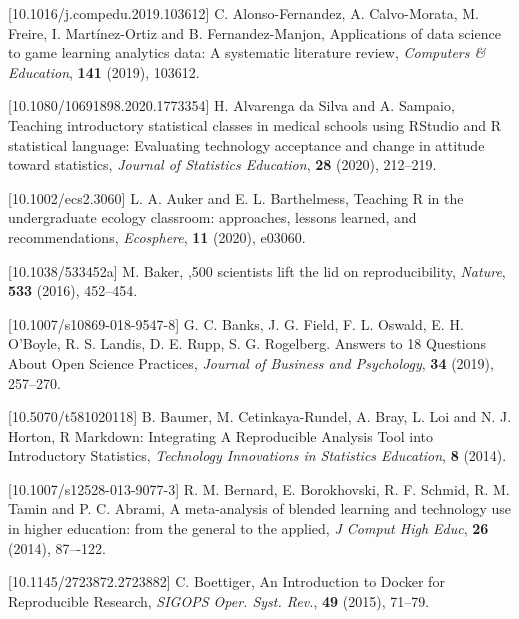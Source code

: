 \documentclass{aims}
\theoremstyle{definition}
\begin{document}
\begin{thebibliography}{99}

 [10.1016/j.compedu.2019.103612]
     \newblock  C. Alonso-Fernandez,  A. Calvo-Morata, M. Freire, I. Martínez-Ortiz and B. Fernandez-Manjon,
     \newblock Applications of data science to game learning analytics data: A systematic literature review,
     \newblock \emph{Computers \& Education}, \textbf{141} (2019), 103612.

 [10.1080/10691898.2020.1773354]
     \newblock  H. Alvarenga da Silva and A. Sampaio,
     \newblock Teaching introductory statistical classes in medical schools using RStudio and R statistical language: Evaluating technology acceptance and change in attitude toward statistics,
     \newblock \emph{Journal of Statistics Education}, \textbf{28} (2020), 212--219.

 [10.1002/ecs2.3060]
     \newblock  L. A. Auker and E. L. Barthelmess,
     \newblock Teaching R in the undergraduate ecology classroom: approaches, lessons learned, and recommendations,
     \newblock \emph{Ecosphere}, \textbf{11} (2020), e03060.

 [10.1038/533452a]
     \newblock  M. Baker,
     ,500 scientists lift the lid on reproducibility,
     \newblock \emph{Nature}, \textbf{533} (2016), 452--454.

 [10.1007/s10869-018-9547-8]
     \newblock  G. C. Banks, J. G. Field, F. L. Oswald, E. H. O'Boyle, R. S. Landis, D. E. Rupp, S. G. Rogelberg.
     \newblock Answers to 18 Questions About Open Science Practices,
     \newblock \emph{Journal of Business and Psychology}, \textbf{34} (2019), 257--270.

 [10.5070/t581020118]
     \newblock B. Baumer, M. Cetinkaya-Rundel, A. Bray, L. Loi and N. J. Horton,
     \newblock R Markdown: Integrating A Reproducible Analysis Tool into Introductory Statistics,
     \newblock \emph{Technology Innovations in Statistics Education}, \textbf{8} (2014).

 [10.1007/s12528-013-9077-3]
     \newblock  R. M. Bernard, E. Borokhovski, R. F. Schmid, R. M. Tamin and P. C. Abrami,
     \newblock A meta-analysis of blended learning and technology use in higher education: from the general to the applied,
     \newblock \emph{J Comput High Educ}, \textbf{26} (2014), 87–-122.

 [10.1145/2723872.2723882]
     \newblock  C. Boettiger,
     \newblock An Introduction to Docker for Reproducible Research,
     \newblock \emph{SIGOPS Oper. Syst. Rev.}, \textbf{49} (2015), 71--79.


\end{thebibliography}
\end{document}

